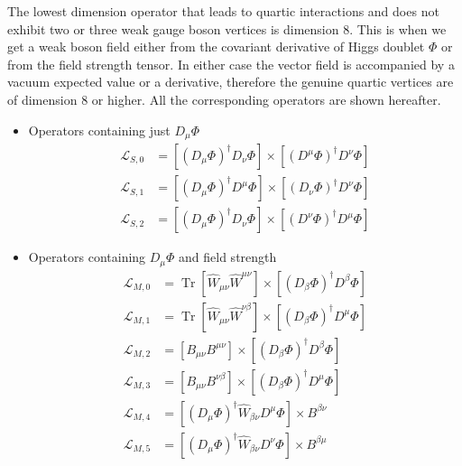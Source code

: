 The lowest dimension operator that leads to quartic interactions and does not exhibit two or three weak gauge boson vertices is dimension 8. 
This is when we get a weak boson field either from the covariant derivative of Higgs doublet $\Phi$ or from the field strength tensor. 
In either case the vector field is accompanied by a vacuum expected value or a derivative, therefore the genuine quartic vertices are of dimension 8 or higher.
All the corresponding operators are shown hereafter.

\begin{itemize}
\item Operators containing just $D_\mu \Phi$
\begin{equation}
\begin{aligned}
\mathcal{L}_{S, 0} &=\left[\left(D_{\mu} \Phi\right)^{\dagger} D_{\nu} \Phi\right] \times\left[\left(D^{\mu} \Phi\right)^{\dagger} D^{\nu} \Phi\right] \\
\mathcal{L}_{S, 1} &=\left[\left(D_{\mu} \Phi\right)^{\dagger} D^{\mu} \Phi\right] \times\left[\left(D_{\nu} \Phi\right)^{\dagger} D^{\nu} \Phi\right] \\
\mathcal{L}_{S, 2} &=\left[\left(D_{\mu} \Phi\right)^{\dagger} D_{\nu} \Phi\right] \times\left[\left(D^{\nu} \Phi\right)^{\dagger} D^{\mu} \Phi\right]
\end{aligned}
\end{equation}
\item Operators containing $D_\mu \Phi$ and field strength 
\begin{equation}
\begin{aligned}
\mathcal{L}_{M, 0} &=\operatorname{Tr}\left[\hat{W}_{\mu \nu} \hat{W}^{\mu \nu}\right] \times\left[\left(D_{\beta} \Phi\right)^{\dagger} D^{\beta} \Phi\right] \\
\mathcal{L}_{M, 1} &=\operatorname{Tr}\left[\hat{W}_{\mu \nu} \hat{W}^{\nu \beta}\right] \times\left[\left(D_{\beta} \Phi\right)^{\dagger} D^{\mu} \Phi\right] \\
\mathcal{L}_{M, 2} &=\left[B_{\mu \nu} B^{\mu \nu}\right] \times\left[\left(D_{\beta} \Phi\right)^{\dagger} D^{\beta} \Phi\right] \\
\mathcal{L}_{M, 3} &=\left[B_{\mu \nu} B^{\nu \beta}\right] \times\left[\left(D_{\beta} \Phi\right)^{\dagger} D^{\mu} \Phi\right] \\
\mathcal{L}_{M, 4} &=\left[\left(D_{\mu} \Phi\right)^{\dagger} \hat{W}_{\beta \nu} D^{\mu} \Phi\right] \times B^{\beta \nu} \\
\mathcal{L}_{M, 5} &=\left[\left(D_{\mu} \Phi\right)^{\dagger} \hat{W}_{\beta \nu} D^{\nu} \Phi\right] \times B^{\beta \mu} \\

\end{aligned}
\end{equation}
\end{itemize}
